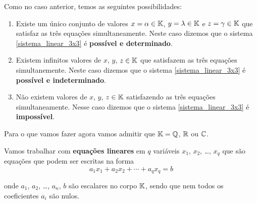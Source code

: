 \documentclass{beamer}
\begin{document}
    \begin{frame}
        Como no caso anterior, temos as seguintes possibilidades:\pause
        \begin{enumerate}[label={\roman*})]
            \item Existe um único conjunto de valores $x = \alpha \in \mathbb{K}$, $y = \lambda \in \mathbb{K}$ e $z = \gamma \in \mathbb{K}$ \pause que satisfaz as três equações simultaneamente. \pause Neste caso dizemos que o sistema \eqref{sistema_linear_3x3} \pause é \textbf{possível e determinado}.\pause

            \item Existem infinitos valores de $x$, $y$, $z \in \mathbb{K}$ \pause que satisfazem as três equações simultanemente. \pause Neste caso dizemos que o sistema \eqref{sistema_linear_3x3} \pause é \textbf{possível e indeterminado}.\pause

            \item Não existem valores de $x$, $y$, $z \in \mathbb{K}$ \pause satisfazendo as três equações simultaneamente. \pause Nesse caso dizemos que o sistema \eqref{sistema_linear_3x3} \pause é \textbf{impossível}.
        \end{enumerate}
    \end{frame}

    \begin{frame}

        Para o que vamos fazer agora vamos admitir que $\mathbb{K} = \mathbb{Q}$, \pause $\mathbb{R}$ \pause ou $\mathbb{C}$.\pause

        \vspace{.3cm}

        Vamos trabalhar com \textbf{equações lineares} em $q$ variáveis $x_1$, $x_2$, \dots, $x_q$ \pause que são equações que podem ser escritas na forma
        \[
            a_1x_1 + a_2x_2 + \cdots + a_qx_q = b
        \]

        onde $a_1$, $a_2$, \dots, $a_n$, $b$ são escalares no corpo $\mathbb{K}$, sendo que nem todos os coeficientes $a_i$ são nulos.
        \end{frame}
    
\end{document}
